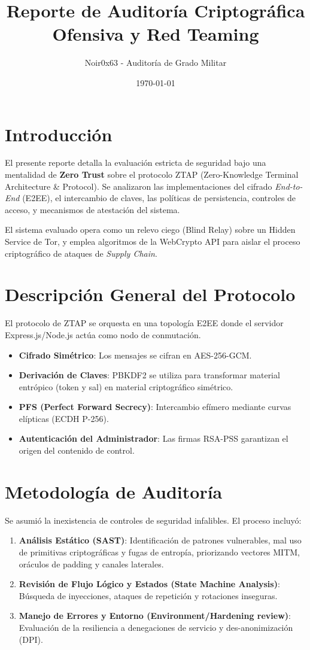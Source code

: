 \documentclass[12pt,a4paper]{article}
\title{\textbf{\Huge{Reporte de Auditoría Criptográfica Ofensiva y Red Teaming}}}
\author{Noir0x63 - Auditoría de Grado Militar}
\date{\today}
\begin{document}
\maketitle

\section{Introducción}
El presente reporte detalla la evaluación estricta de seguridad bajo una mentalidad de \textbf{Zero Trust} sobre el protocolo ZTAP (Zero-Knowledge Terminal Architecture \& Protocol). Se analizaron las implementaciones del cifrado \textit{End-to-End} (E2EE), el intercambio de claves, las políticas de persistencia, controles de acceso, y mecanismos de atestación del sistema.

El sistema evaluado opera como un relevo ciego (Blind Relay) sobre un Hidden Service de Tor, y emplea algoritmos de la WebCrypto API para aislar el proceso criptográfico de ataques de \textit{Supply Chain}.

\section{Descripción General del Protocolo}
El protocolo de ZTAP se orquesta en una topología E2EE donde el servidor Express.js/Node.js actúa como nodo de conmutación.
\begin{itemize}
    \item \textbf{Cifrado Simétrico}: Los mensajes se cifran en AES-256-GCM.
    \item \textbf{Derivación de Claves}: PBKDF2 se utiliza para transformar material entrópico (token y sal) en material criptográfico simétrico.
    \item \textbf{PFS (Perfect Forward Secrecy)}: Intercambio efímero mediante curvas elípticas (ECDH P-256).
    \item \textbf{Autenticación del Administrador}: Las firmas RSA-PSS garantizan el origen del contenido de control.
\end{itemize}

\section{Metodología de Auditoría}
Se asumió la inexistencia de controles de seguridad infalibles. El proceso incluyó:
\begin{enumerate}
    \item \textbf{Análisis Estático (SAST)}: Identificación de patrones vulnerables, mal uso de primitivas criptográficas y fugas de entropía, priorizando vectores MITM, oráculos de padding y canales laterales.
    \item \textbf{Revisión de Flujo Lógico y Estados (State Machine Analysis)}: Búsqueda de inyecciones, ataques de repetición y rotaciones inseguras.
    \item \textbf{Manejo de Errores y Entorno (Environment/Hardening review)}: Evaluación de la resiliencia a denegaciones de servicio y des-anonimización (DPI).
\end{enumerate}
\end{document}
